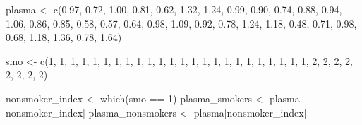 \documentclass[
  letterpaper,
  DIV=11,
  numbers=noendperiod]{scrreprt}
\newenvironment{Shaded}{\begin{snugshade}}{\end{snugshade}}
\newcommand{\DecValTok}[1]{\textcolor[rgb]{0.68,0.00,0.00}{#1}}
\newcommand{\FloatTok}[1]{\textcolor[rgb]{0.68,0.00,0.00}{#1}}
\newcommand{\FunctionTok}[1]{\textcolor[rgb]{0.28,0.35,0.67}{#1}}
\newcommand{\NormalTok}[1]{\textcolor[rgb]{0.00,0.23,0.31}{#1}}
\newcommand{\OtherTok}[1]{\textcolor[rgb]{0.00,0.23,0.31}{#1}}
\newcommand{\SpecialCharTok}[1]{\textcolor[rgb]{0.37,0.37,0.37}{#1}}
\begin{document}
\begin{Shaded}
\begin{Highlighting}[]
\NormalTok{plasma }\OtherTok{\textless{}{-}} \FunctionTok{c}\NormalTok{(}\FloatTok{0.97}\NormalTok{, }\FloatTok{0.72}\NormalTok{, }\FloatTok{1.00}\NormalTok{, }\FloatTok{0.81}\NormalTok{, }\FloatTok{0.62}\NormalTok{, }\FloatTok{1.32}\NormalTok{, }\FloatTok{1.24}\NormalTok{, }\FloatTok{0.99}\NormalTok{, }\FloatTok{0.90}\NormalTok{, }\FloatTok{0.74}\NormalTok{,}
          \FloatTok{0.88}\NormalTok{, }\FloatTok{0.94}\NormalTok{, }\FloatTok{1.06}\NormalTok{, }\FloatTok{0.86}\NormalTok{, }\FloatTok{0.85}\NormalTok{, }\FloatTok{0.58}\NormalTok{, }\FloatTok{0.57}\NormalTok{, }\FloatTok{0.64}\NormalTok{, }\FloatTok{0.98}\NormalTok{, }\FloatTok{1.09}\NormalTok{,}
          \FloatTok{0.92}\NormalTok{, }\FloatTok{0.78}\NormalTok{, }\FloatTok{1.24}\NormalTok{, }\FloatTok{1.18}\NormalTok{, }\FloatTok{0.48}\NormalTok{, }\FloatTok{0.71}\NormalTok{, }\FloatTok{0.98}\NormalTok{, }\FloatTok{0.68}\NormalTok{, }\FloatTok{1.18}\NormalTok{, }\FloatTok{1.36}\NormalTok{,}
          \FloatTok{0.78}\NormalTok{, }\FloatTok{1.64}\NormalTok{)}

\NormalTok{smo }\OtherTok{\textless{}{-}} \FunctionTok{c}\NormalTok{(}\DecValTok{1}\NormalTok{, }\DecValTok{1}\NormalTok{, }\DecValTok{1}\NormalTok{, }\DecValTok{1}\NormalTok{, }\DecValTok{1}\NormalTok{, }\DecValTok{1}\NormalTok{, }\DecValTok{1}\NormalTok{, }\DecValTok{1}\NormalTok{, }\DecValTok{1}\NormalTok{, }\DecValTok{1}\NormalTok{, }\DecValTok{1}\NormalTok{, }\DecValTok{1}\NormalTok{, }\DecValTok{1}\NormalTok{, }\DecValTok{1}\NormalTok{, }\DecValTok{1}\NormalTok{, }\DecValTok{1}\NormalTok{, }\DecValTok{1}\NormalTok{, }\DecValTok{1}\NormalTok{, }\DecValTok{1}\NormalTok{, }\DecValTok{1}\NormalTok{, }\DecValTok{1}\NormalTok{, }
       \DecValTok{1}\NormalTok{, }\DecValTok{1}\NormalTok{, }\DecValTok{1}\NormalTok{, }\DecValTok{2}\NormalTok{, }\DecValTok{2}\NormalTok{, }\DecValTok{2}\NormalTok{, }\DecValTok{2}\NormalTok{, }\DecValTok{2}\NormalTok{, }\DecValTok{2}\NormalTok{, }\DecValTok{2}\NormalTok{, }\DecValTok{2}\NormalTok{)}

\NormalTok{nonsmoker\_index }\OtherTok{\textless{}{-}} \FunctionTok{which}\NormalTok{(smo }\SpecialCharTok{==} \DecValTok{1}\NormalTok{)}
\NormalTok{plasma\_smokers }\OtherTok{\textless{}{-}}\NormalTok{ plasma[}\SpecialCharTok{{-}}\NormalTok{nonsmoker\_index]}
\NormalTok{plasma\_nonsmokers }\OtherTok{\textless{}{-}}\NormalTok{ plasma[nonsmoker\_index]}
\end{Highlighting}
\end{Shaded}
\end{document}
